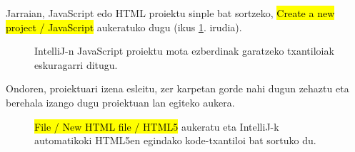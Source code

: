 Jarraian, JavaScript edo HTML proiektu sinple bat sortzeko, \hl{Create a new project / JavaScript} aukeratuko dugu (ikus \ref{fig:intellijsnewjsproject}. irudia).

\begin{figure}[ht]
	\centering
{}
\caption{IntelliJ-n JavaScript proiektu mota ezberdinak garatzeko txantiloiak eskuragarri ditugu.}
\label{fig:intellijsnewjsproject}
\end{figure}

Ondoren, proiektuari izena esleitu, zer karpetan gorde nahi dugun zehaztu eta berehala izango dugu proiektuan lan egiteko aukera. 

\begin{figure}[ht]
	\centering
{}
\caption{\hl{File / New HTML file / HTML5} aukeratu eta IntelliJ-k automatikoki HTML5en egindako kode-txantiloi bat sortuko du.}
\label{fig:intellijs}
\end{figure}

